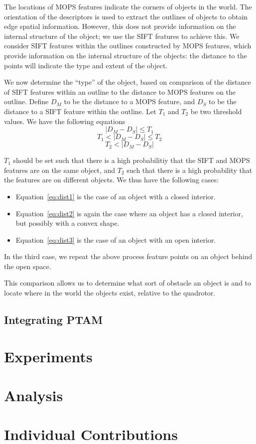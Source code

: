 \documentclass{acmsiggraph}
\begin{document}
The locations of MOPS features indicate the corners of objects in the world. The orientation of the descriptors is used to extract the outlines of objects to obtain edge spatial information. However, this does not provide information on the internal structure of the object; we use the SIFT features to achieve this. We consider SIFT features within the outlines constructed by MOPS features, which provide information on the internal structure of the objects: the distance to the points will indicate the type and extent of the object.

We now determine the ``type'' of the object, based on comparison of the distance of SIFT features within an outline to the distance to MOPS features on the outline. Define $D_M$ to be the distance to a MOPS feature, and $D_S$ to be the distance to a SIFT feature within the outline. Let $T_1$ and $T_2$ be two threshold values. We have the following equations
\begin{equation}
  \label{eq:dist1}
  | D_M - D_S | \leq T_1
\end{equation}
\begin{equation}
  \label{eq:dist2}
  T_1 < | D_M - D_S | \leq T_2
\end{equation}
\begin{equation}
  \label{eq:dist3}
  T_2 < | D_M - D_S |
\end{equation}

$T_1$ should be set such that there is a high probabilitiy that the SIFT and MOPS features are on the same object, and $T_2$ such that there is a high probability that the features are on different objects. We thus have the following cases:
\begin{itemize}
\item Equation~\ref{eq:dist1} is the case of an object with a closed interior.
\item Equation~\ref{eq:dist2} is again the case where an object has a closed interior, but possibly with a convex shape.
\item Equation~\ref{eq:dist3} is the case of an object with an open interior.
\end{itemize}
In the third case, we repeat the above process feature points on an object behind the open space.

This comparison allows us to determine what sort of obstacle an object is and to locate where in the world the objects exist, relative to the quadrotor.

\subsection{Integrating PTAM}


\section{Experiments}


\section{Analysis}


\section{Individual Contributions}




\end{document}
